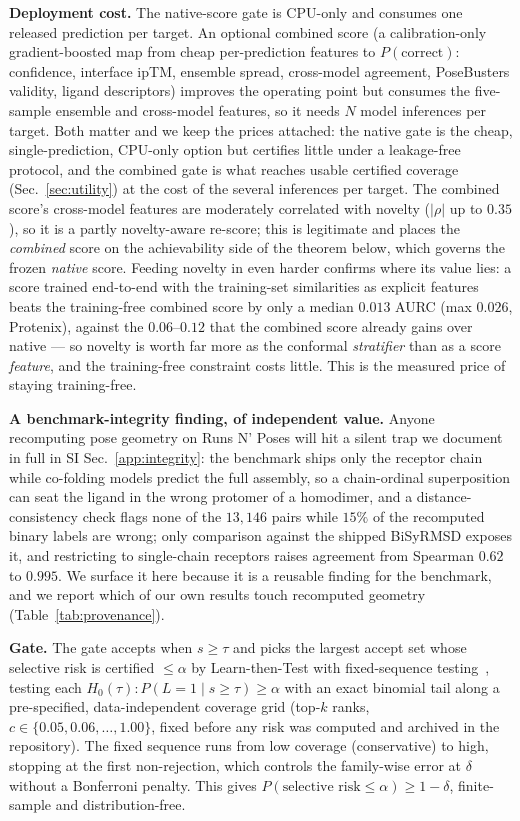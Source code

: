 \documentclass[10pt]{article}
\begin{document}
\textbf{Deployment cost.} The native-score gate is CPU-only and consumes one released prediction per
target. An optional combined score (a calibration-only gradient-boosted map from cheap per-prediction
features to $P(\text{correct})$: confidence, interface ipTM, ensemble spread, cross-model agreement,
PoseBusters validity, ligand descriptors) improves the operating point but consumes the five-sample
ensemble and cross-model features, so it needs $N$ model inferences per target. Both matter and we keep the
prices attached: the native gate is the cheap, single-prediction, CPU-only option but certifies little
under a leakage-free protocol, and the combined gate is what reaches usable certified coverage
(Sec.~\ref{sec:utility}) at the cost of the several inferences per target. The combined score's cross-model features
are moderately correlated with novelty ($|\rho|$ up to $0.35$), so it is a partly novelty-aware re-score;
this is legitimate and places the \emph{combined} score on the achievability side of the theorem below,
which governs the frozen \emph{native} score. Feeding novelty in even harder confirms where its value lies:
a score trained end-to-end with the training-set similarities as explicit features beats the training-free
combined score by only a median $0.013$ AURC (max $0.026$, Protenix), against the $0.06$--$0.12$ that the
combined score already gains over native --- so novelty is worth far more as the conformal \emph{stratifier}
than as a score \emph{feature}, and the training-free constraint costs little. This is the measured price of
staying training-free.

\textbf{A benchmark-integrity finding, of independent value.} Anyone recomputing pose geometry on Runs N'
Poses will hit a silent trap we document in full in SI Sec.~\ref{app:integrity}: the benchmark ships only the
receptor chain while co-folding models predict the full assembly, so a chain-ordinal superposition can seat
the ligand in the wrong protomer of a homodimer, and a distance-consistency check flags none of the
$13{,}146$ pairs while $15\%$ of the recomputed binary labels are wrong; only comparison against the shipped
BiSyRMSD exposes it, and restricting to single-chain receptors raises agreement from Spearman $0.62$ to
$0.995$. We surface it here because it is a reusable finding for the benchmark, and we
report which of our own results touch recomputed geometry (Table~\ref{tab:provenance}).

\textbf{Gate.} The gate accepts when $s\ge\tau$ and picks the largest accept set whose selective risk is
certified $\le\alpha$ by Learn-then-Test with fixed-sequence testing~\citep{angelopoulos2021ltt}, testing
each $H_0(\tau):P(L{=}1\mid s\ge\tau)\ge\alpha$ with an exact binomial tail along a pre-specified,
data-independent coverage grid (top-$k$ ranks, $c\in\{0.05,0.06,\dots,1.00\}$, fixed before any risk was
computed and archived in the repository). The fixed sequence runs from low coverage (conservative) to high,
stopping at the first non-rejection, which controls the family-wise error at $\delta$ without a Bonferroni
penalty. This gives $P(\text{selective risk}\le\alpha)\ge 1-\delta$, finite-sample and distribution-free.
\end{document}
